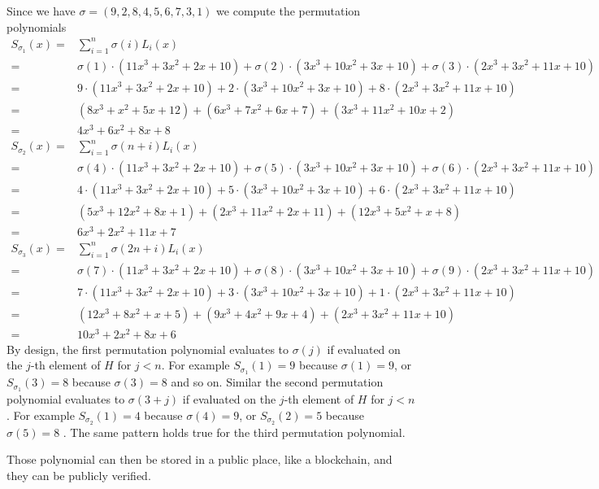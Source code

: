 \begin{example}
Since we have $\sigma = (9,2,8,4,5,6,7,3,1)$ we compute the permutation polynomials
$$
\begin{array}{rl}
S_{\sigma_1}(x) = & \sum_{i=1}^{n} \sigma(i)L_i(x) \\       
         = & \sigma(1)\cdot(11x^3 +3x^2 +2x + 10) + \sigma(2)\cdot (3x^3 +10x^2+ 3x + 10) + \sigma(3)\cdot (2x^3 + 3x^2 +11x +10) \\            
         = & 9\cdot(11x^3 +3x^2 +2x + 10) + 2\cdot (3x^3 +10x^2+ 3x + 10) + 8\cdot (2x^3 + 3x^2 +11x +10) \\           
         = & (8x^3 + x^2 + 5x + 12) + (6x^3 + 7x^2 + 6x + 7) + (3x^3 + 11x^2 + 10x + 2) \\    
         = & 4x^3 + 6x^2 + 8x + 8             
\end{array}
$$
$$
\begin{array}{rl}
S_{\sigma_2}(x) = & \sum_{i=1}^{n} \sigma(n+i)L_i(x) \\       
         = & \sigma(4)\cdot(11x^3 +3x^2 +2x + 10) + \sigma(5)\cdot (3x^3 +10x^2+ 3x + 10) + \sigma(6)\cdot (2x^3 + 3x^2 +11x +10) \\ 
         = & 4\cdot(11x^3 +3x^2 +2x + 10) + 5\cdot (3x^3 +10x^2+ 3x + 10) + 6\cdot (2x^3 + 3x^2 +11x +10) \\ 
         = &  (5x^3 + 12x^2 + 8x + 1) + (2x^3 + 11x^2 + 2x + 11) + (12x^3 + 5x^2 + x + 8) \\
         = & 6x^3 + 2x^2 + 11x + 7
\end{array}
$$
$$
\begin{array}{rl}
S_{\sigma_3}(x) = & \sum_{i=1}^{n} \sigma(2n+i)L_i(x) \\       
         = & \sigma(7)\cdot(11x^3 +3x^2 +2x + 10) + \sigma(8)\cdot (3x^3 +10x^2+ 3x + 10) + \sigma(9)\cdot (2x^3 + 3x^2 +11x +10) \\ 
         = & 7\cdot(11x^3 +3x^2 +2x + 10) + 3\cdot (3x^3 +10x^2+ 3x + 10) + 1\cdot (2x^3 + 3x^2 +11x +10) \\  
         = & (12x^3 + 8x^2 + x + 5) + (9x^3 + 4x^2 + 9x + 4) + (2x^3 + 3x^2 + 11x + 10)\\
         = & 10x^3 + 2x^2 + 8x + 6
\end{array}
$$
By design, the first permutation polynomial evaluates to $\sigma(j)$ if evaluated on the $j$-th element of $H$ for $j<n$. For example $S_{\sigma_1}(1)=9$ because $\sigma(1)=9$, or $S_{\sigma_1}(3)=8$ because $\sigma(3)=8$ and so on. Similar the second permutation polynomial evaluates to $\sigma(3+j)$ if evaluated on the $j$-th element of $H$ for $j<n$. For example $S_{\sigma_2}(1)=4$ because $\sigma(4)=9$, or $S_{\sigma_2}(2)=5$ because $\sigma(5)=8$ . The same pattern holds true for the third permutation polynomial.


Those polynomial can then be stored in a public place, like a blockchain, and they can be publicly verified.
\end{example}

